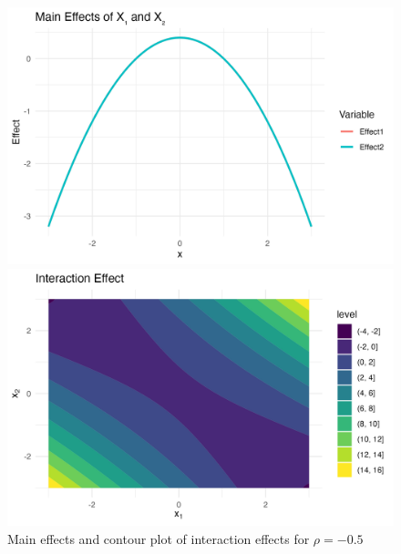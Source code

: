 \begin{figure}[htpb]
    \centering
    \begin{minipage}[t]{0.49\textwidth}
        \centering
        \includegraphics[width=\textwidth]{images/interaction_a1p00_a2p00_a11p00_a22p00_a12p10_rhom05_main.png}
    \end{minipage}%
    \hfill
    \begin{minipage}[t]{0.49\textwidth}
        \centering
        \includegraphics[width=\textwidth]{images/interaction_a1p00_a2p00_a11p00_a22p00_a12p10_rhom05_interaction.png}
    \end{minipage}
    \caption{Main effects and contour plot of interaction effects for $\rho = -0.5$}
    \label{fig:interaction_rho_neg05}
\end{figure}

